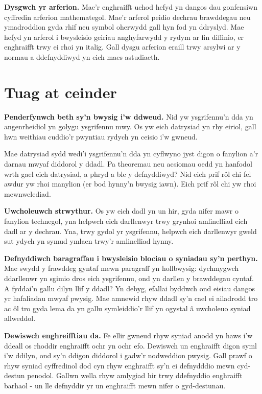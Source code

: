 \documentclass{article}
\begin{document}
\begin{multicols}{2}
\textbf{Dysgwch yr arferion.}
Mae'r enghraifft uchod hefyd yn dangos dau gonfensiwn cyffredin arferion
mathemategol.
Mae'r arferol peidio dechrau brawddegau neu ymadroddion gyda rhif neu symbol
oherwydd gall hyn fod yn ddryslyd.
Mae hefyd yn arferol i bwysleisio geiriau anghyfarwydd y rydym ar fin diffinio,
er enghraifft trwy ei rhoi yn italig.
Gall dysgu arferion eraill trwy arsylwi ar y normau a ddefnyddiwyd yn eich maes
astudiaeth.


\section*{Tuag at ceinder}

\textbf{Penderfynwch beth sy'n bwysig i'w ddweud.}
Nid yw ysgrifennu'n dda yn angenrheidiol yn golygu ysgrifennu mwy.
Os yw eich datrysiad yn rhy eiriol, gall hwn weithiau cuddio'r pwyntiau rydych
yn ceisio i'w gwneud.

Mae datrysiad sydd wedi'i ysgrifennu'n dda yn cyflwyno jyst digon o fanylion a'r
darnau mwyaf diddorol y ddadl.
Pa theoremau neu acsiomau oedd yn hanfodol wrth gael eich datrysiad, a phryd a
ble y defnyddiwyd?
Nid eich prif r\^{o}l chi fel awdur yw rhoi manylion (er bod hynny'n bwysig
iawn).
Eich prif r\^{o}l chi yw rhoi mewnwelediad.

\vspace{4mm}

\textbf{Uwcholeuwch strwythur.}
Os yw eich dadl yn un hir, gyda nifer mawr o fanylion technegol, yna helpwch
eich darllenwyr trwy grynhoi amlinelliad eich dadl ar y dechrau.
Yna, trwy gydol yr ysgrifennu, helpwch eich darllenwyr gweld sut ydych yn symud
ymlaen trwy'r amlinelliad hynny.

\vspace{4mm}

\textbf{Defnyddiwch baragraffau i bwysleisio blociau o syniadau sy'n perthyn.}
Mae swydd y frawddeg gyntaf mewn paragraff yn hollbwysig: dychmygwch ddarllenwr
yn sgimio dros eich ysgrifennu, ond yn darllen y brawddegau cyntaf.
A fyddai'n gallu dilyn llif y ddadl?
Yn debyg, efallai byddwch ond eisiau dangos yr hafaliadau mwyaf pwysig.
Mae amnewid rhyw ddadl sy'n cael ei ailadrodd tro ac \^{o}l tro gyda lema da yn
gallu symleiddio'r llif yn ogystal \^{a} uwcholeuo syniad allweddol.

\vspace{4mm}

\textbf{Dewiswch enghreifftiau da.}
Fe ellir gwneud rhyw syniad anodd yn haws i'w ddeall os rhoddir enghraifft ochr
yn ochr efo.
Dewiswch un enghraifft digon syml i'w ddilyn, ond sy'n ddigon diddorol i gadw'r
nodweddion pwysig.
Gall prawf o rhyw syniad cyffredinol dod cyn rhyw enghraifft sy'n ei defnydddio
mewn cyd-destun penodol.
Gallwn wella rhyw amlygiad hir trwy ddefnyddio enghraifft barhaol - un lle
defnyddir yr un enghraifft mewn nifer o gyd-destunau.


\end{multicols}
\end{document}
